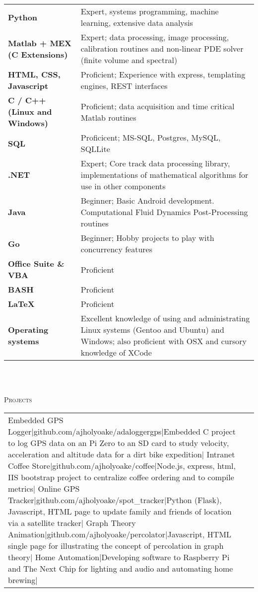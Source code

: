 \documentclass[a4paper,10pt]{article}
\newcommand{\lineunder}{\vspace*{0.2cm} \\ \hspace*{-20pt} \hrulefill \\ \vspace{-0.9cm}}
\newcommand{\header}[1]{{\hspace*{-17pt}\vspace*{6pt} \large{\textsc{#1}}}}
\newenvironment{2colsection}[1][]%
{%
  \header{#1}

  \begin{tabular}{p{2.8in}p{3.3in}}
}
{
  \end{tabular}
  \newline
  \lineunder
}
\begin{document}
\begin{tabular}{p{2.8in}p{3.3in}}
\textbf{Python} & Expert, systems programming, machine learning, extensive data analysis \\
\textbf{Matlab + MEX (C Extensions)} & Expert; data processing, image processing, calibration routines and non-linear PDE solver (finite volume and spectral)\\
\textbf{HTML, CSS, Javascript} & Proficient; Experience with express, templating engines, REST interfaces\\
\textbf{C / C++ (Linux and Windows)}     & Proficient; data acquisition and time critical Matlab routines\\
\textbf{SQL} & Proficicent; MS-SQL, Postgres, MySQL, SQLLite \\
\textbf{.NET} & Expert; Core track data processing library, implementations of mathematical algorithms for use in other components \\
\textbf{Java} & Beginner; Basic Android development. Computational Fluid Dynamics Post-Processing routines\\
\textbf{Go} & Beginner; Hobby projects to play with concurrency features\\
\textbf{Office Suite \& VBA} & Proficient\\
\textbf{BASH}   & Proficient\\
\textbf{\LaTeX} & Proficient\\
\textbf{Operating systems} & Excellent knowledge of using and administrating Linux systems (Gentoo and Ubuntu) and  Windows; also proficient with OSX and cursory knowledge of XCode \\
\end{tabular}
\newline
\lineunder

\begin{2colsection}[Projects]
\Rcc Embedded GPS Logger|github.com/ajholyoake/adaloggergps|Embedded C project
to log GPS data on an Pi Zero to an SD card to study velocity, acceleration and
altitude data for a dirt bike expedition|
\Rcc Intranet Coffee Store|github.com/ajholyoake/coffee|Node.js, express, html, IIS
bootstrap project to centralize coffee ordering and to compile metrics|
\Rcc Online GPS Tracker|github.com/ajholyoake/spot\_tracker|Python (Flask),
Javascript, HTML page to update family and friends of location via a satellite tracker|
\Rcc Graph Theory Animation|github.com/ajholyoake/percolator|Javascript, HTML
single page for illustrating the concept of percolation in graph theory|
\Rc Home Automation|Developing software to Raspberry Pi and The Next Chip for
lighting and audio and automating home brewing|
\end{2colsection}
\end{document}
